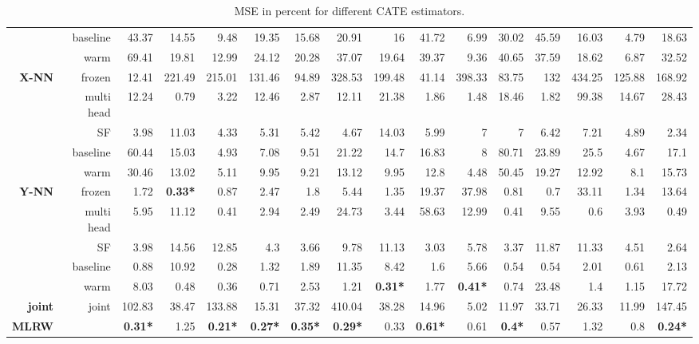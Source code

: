 \begin{table}
\begin{flushleft}
\begin{tabular}{rrrrrrrrrrrrrrrr}
   & baseline & 43.37 & 14.55 & 9.48 & 19.35 & 15.68 & 20.91 & 16 & 41.72 & 6.99 & 30.02 & 45.59 & 16.03 & 4.79 & 18.63 \\ 
   & warm & 69.41 & 19.81 & 12.99 & 24.12 & 20.28 & 37.07 & 19.64 & 39.37 & 9.36 & 40.65 & 37.59 & 18.62 & 6.87 & 32.52 \\ 
   \hline
{\textbf{X-NN}} & frozen & 12.41 & 221.49 & 215.01 & 131.46 & 94.89 & 328.53 & 199.48 & 41.14 & 398.33 & 83.75 & 132 & 434.25 & 125.88 & 168.92 \\ 
   & multi head & 12.24 & 0.79 & 3.22 & 12.46 & 2.87 & 12.11 & 21.38 & 1.86 & 1.48 & 18.46 & 1.82 & 99.38 & 14.67 & 28.43 \\ 
   & SF & 3.98 & 11.03 & 4.33 & 5.31 & 5.42 & 4.67 & 14.03 & 5.99 & 7 & 7 & 6.42 & 7.21 & 4.89 & 2.34 \\ 
   & baseline & 60.44 & 15.03 & 4.93 & 7.08 & 9.51 & 21.22 & 14.7 & 16.83 & 8 & 80.71 & 23.89 & 25.5 & 4.67 & 17.1 \\ 
   & warm & 30.46 & 13.02 & 5.11 & 9.95 & 9.21 & 13.12 & 9.95 & 12.8 & 4.48 & 50.45 & 19.27 & 12.92 & 8.1 & 15.73 \\ 
   \hline
{\textbf{Y-NN}} & frozen & 1.72 & {\textbf{0.33*}} & 0.87 & 2.47 & 1.8 & 5.44 & 1.35 & 19.37 & 37.98 & 0.81 & 0.7 & 33.11 & 1.34 & 13.64 \\ 
   & multi head & 5.95 & 11.12 & 0.41 & 2.94 & 2.49 & 24.73 & 3.44 & 58.63 & 12.99 & 0.41 & 9.55 & 0.6 & 3.93 & 0.49 \\ 
   & SF & 3.98 & 14.56 & 12.85 & 4.3 & 3.66 & 9.78 & 11.13 & 3.03 & 5.78 & 3.37 & 11.87 & 11.33 & 4.51 & 2.64 \\ 
   & baseline & 0.88 & 10.92 & 0.28 & 1.32 & 1.89 & 11.35 & 8.42 & 1.6 & 5.66 & 0.54 & 0.54 & 2.01 & 0.61 & 2.13 \\ 
   & warm & 8.03 & 0.48 & 0.36 & 0.71 & 2.53 & 1.21 & {\textbf{0.31*}} & 1.77 & {\textbf{0.41*}} & 0.74 & 23.48 & 1.4 & 1.15 & 17.72 \\ 
   \hline
{\textbf{joint}} & joint & 102.83 & 38.47 & 133.88 & 15.31 & 37.32 & 410.04 & 38.28 & 14.96 & 5.02 & 11.97 & 33.71 & 26.33 & 11.99 & 147.45 \\ 
   \hline
{\textbf{MLRW}} &  & {\textbf{0.31*}} & 1.25 & {\textbf{0.21*}} & {\textbf{0.27*}} & {\textbf{0.35*}} & {\textbf{0.29*}} & 0.33 & {\textbf{0.61*}} & 0.61 & {\textbf{0.4*}} & 0.57 & 1.32 & 0.8 & {\textbf{0.24*}} \\ 
  \end{tabular}
\caption{MSE in percent for different CATE estimators.} 
\label{table:RF1}
\end{flushleft}
\end{table}
